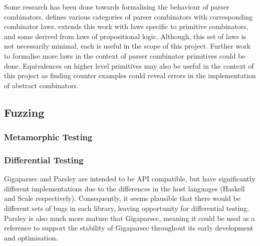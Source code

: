 \documentclass[11pt]{article}
\let\oldciteauthor\citeauthor
\renewcommand{\citeauthor}[1]{\oldciteauthor{#1} \cite{#1}}
\begin{document}
Some research has been done towards formalising the behaviour of parser combinators. \citeauthor{parsley} defines various categories of parser combinators with corresponding combinator laws. \citeauthor{staged-selective} extends this work with laws specific to primitive combinators, and some derived from laws of propositional logic. Although, this set of laws is not necessarily minimal, each is useful in the scope of this project. Further work to formalise more laws in the context of parser combinator primitives could be done. Equivalences on higher level primitives may also be useful in the context of this project as finding counter examples could reveal errors in the implementation of abstract combinators.

\subsection{Fuzzing}



\subsubsection{Metamorphic Testing}


\subsubsection{Differential Testing}
Gigaparsec and Parsley are intended to be API compatible, but have significantly different implementations due to the differences in the host languages (Haskell and Scale respectively). Consequently, it seems plausible that there would be different sets of bugs in each library, leaving opportunity for differential testing. Parsley is also much more mature that Gigaparsec, meaning it could be used as a reference to support the stability of Gigaparsec throughout its early development and optimisation.
\end{document}
